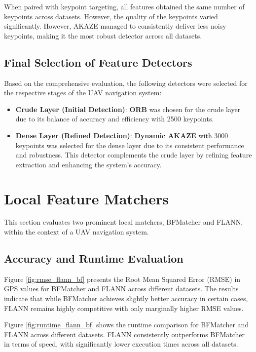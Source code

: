 When paired with keypoint targeting, all features obtained the same number of keypoints across datasets. However, the quality of the keypoints varied significantly. However, AKAZE managed to consistently deliver less noisy keypoints, making it the most robust detector across all datasets. 

\subsection{Final Selection of Feature Detectors}

Based on the comprehensive evaluation, the following detectors were selected for the respective stages of the UAV navigation system:

\begin{itemize}
    \item \textbf{Crude Layer (Initial Detection)}: \textbf{ORB} was chosen for the crude layer due to its balance of accuracy and efficiency with 2500 keypoints. 
    
    \item \textbf{Dense Layer (Refined Detection)}: \textbf{Dynamic AKAZE} with 3000 keypoints was selected for the dense layer due to its consistent performance and robustness. This detector complements the crude layer by refining feature extraction and enhancing the system's accuracy.
\end{itemize}


\section{Local Feature Matchers}

This section evaluates two prominent local matchers, BFMatcher and FLANN, within the context of a UAV navigation system. 

\subsection{Accuracy and Runtime Evaluation}

Figure \ref{fig:rmse_flann_bf} presents the Root Mean Squared Error (RMSE) in GPS values for BFMatcher and FLANN across different datasets. The results indicate that while BFMatcher achieves slightly better accuracy in certain cases, FLANN remains highly competitive with only marginally higher RMSE values.

Figure \ref{fig:runtime_flann_bf} shows the runtime comparison for BFMatcher and FLANN across different datasets. FLANN consistently outperforms BFMatcher in terms of speed, with significantly lower execution times across all datasets.

